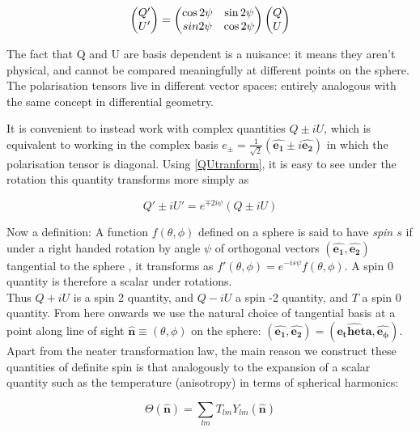 \documentclass[a4paper,10pt]{article}
\renewcommand{\v}[1]{\mathbf{#1}}
\newcommand{\unit}[1]{\hat{\v{#1}}}
\begin{document}
\begin{equation}
\begin{pmatrix}
Q'\\
U' 
\end{pmatrix}
=
\begin{pmatrix}
\cos{2\psi} & \sin{2\psi}\\ 
\-sin{2\psi} & \cos{2\psi}
\end{pmatrix}
\begin{pmatrix}
Q\\
U
\end{pmatrix}
\label{QUtranform}
\end{equation}

The fact that Q and U are basis dependent is a nuisance: it means they aren't physical, and cannot be compared meaningfully at different points on the sphere. The polarisation tensors live in different vector spaces: entirely analogous with the same concept in differential geometry. 

It is convenient to instead work with complex quantities $Q\pm iU$, which is equivalent to working in the complex basis $e_\pm = \frac{1}{\sqrt{2}}(\unit{e_1} \pm i\unit{e_2})$ in which the polarisation tensor is diagonal. Using \ref{QUtranform}, it is easy to see under the rotation this quantity transforms more simply as

\begin{equation}
Q'\pm iU' = e^{\mp 2i\psi}(Q\pm iU)
\end{equation}

Now a definition: A function $f(\theta, \phi)$ defined on a sphere is said to have \textit{spin $s$} if under a right handed rotation by angle $\psi$ of orthogonal vectors $(\unit{e_1}, \unit{e_2})$ tangential to the sphere , it transforms as $f'(\theta, \phi) = e^{-is\psi}f(\theta, \phi)$. A spin 0 quantity is therefore a scalar under rotations.\\

Thus $Q+iU$ is a spin 2 quantity, and $Q-iU$ a spin -2 quantity, and $T$ a spin 0 quantity. From here onwards we use the natural choice of tangential basis at a point along line of sight $\unit{n} \equiv (\theta, \phi)$ on the sphere: $(\unit{e_1}, \unit{e_2}) = (\unit{e_theta}, \unit{e_\phi})$. Apart from the neater transformation law, the main reason we construct these quantities of definite spin is that analogously to the expansion of a scalar quantity such as the temperature (anisotropy) in terms of spherical harmonics:

\begin{equation}
\Theta(\unit{n}) = \sum_{lm} T_{lm}Y_{lm}(\unit{n})
\end{equation}
\end{document}
